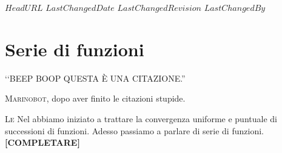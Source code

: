 \svnidlong
{$HeadURL$}
{$LastChangedDate$}
{$LastChangedRevision$}
{$LastChangedBy$}

\chapter{Serie di funzioni}

\begin{introduction}
	‘‘BEEP BOOP QUESTA È UNA CITAZIONE.''
\begin{flushright}
	\textsc{Marinobot,} dopo aver finito le citazioni stupide.
\end{flushright}
\end{introduction}
\lettrine[findent=1pt, nindent=0pt]{L}{e} Nel  abbiamo iniziato a trattare la convergenza uniforme e puntuale di successioni di funzioni. Adesso passiamo a parlare di serie di funzioni.
\textbf{[COMPLETARE]} %
